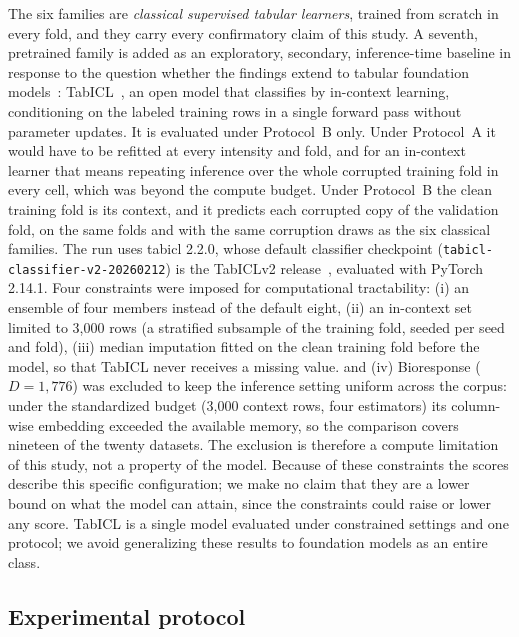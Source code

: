 \documentclass[pdflatex,sn-mathphys]{sn-jnl}
\theoremstyle{thmstyleone}
\theoremstyle{thmstyletwo}
\theoremstyle{thmstylethree}
\begin{document}
The six families are \emph{classical supervised tabular learners}, trained from scratch in every fold, and they carry every confirmatory claim of this study. A seventh, pretrained family is added as an exploratory, secondary, inference-time baseline in response to the question whether the findings extend to tabular foundation models~\cite{hollmann2023tabpfn}: TabICL~\cite{qu2025tabicl}, an open model that classifies by in-context learning, conditioning on the labeled training rows in a single forward pass without parameter updates. It is evaluated under Protocol~B only. Under Protocol~A it would have to be refitted at every intensity and fold, and for an in-context learner that means repeating inference over the whole corrupted training fold in every cell, which was beyond the compute budget. Under Protocol~B the clean training fold is its context, and it predicts each corrupted copy of the validation fold, on the same folds and with the same corruption draws as the six classical families. The run uses tabicl 2.2.0, whose default classifier checkpoint (\texttt{tabicl-classifier-v2-20260212}) is the TabICLv2 release~\cite{qu2025tabicl}, evaluated with PyTorch 2.14.1. Four constraints were imposed for computational tractability: (i) an ensemble of four members instead of the default eight, (ii) an in-context set limited to 3{,}000 rows (a stratified subsample of the training fold, seeded per seed and fold), (iii) median imputation fitted on the clean training fold before the model, so that TabICL never receives a missing value. and (iv) Bioresponse ($D=1{,}776$) was excluded to keep the inference setting uniform across the corpus: under the standardized budget (3{,}000 context rows, four estimators) its column-wise embedding exceeded the available memory, so the comparison covers nineteen of the twenty datasets. The exclusion is therefore a compute limitation of this study, not a property of the model. Because of these constraints the scores describe this specific configuration; we make no claim that they are a lower bound on what the model can attain, since the constraints could raise or lower any score. TabICL is a single model evaluated under constrained settings and one protocol; we avoid generalizing these results to foundation models as an entire class.

\subsection{Experimental protocol}\label{sec:method:protocol}
\end{document}
